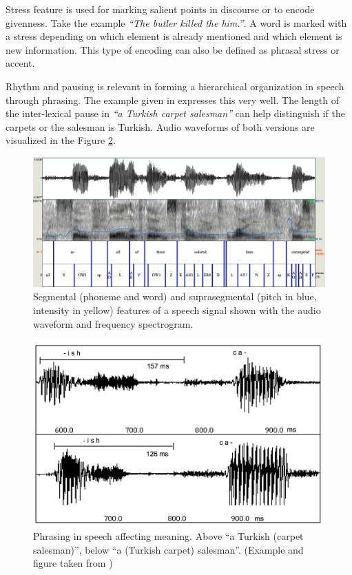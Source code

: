 Stress feature is used for marking salient points in discourse or to encode givenness. Take the example \textit{``The butler killed the him.''}. A word is marked with a stress depending on which element is already mentioned and which element is new information. This type of encoding can also be defined as phrasal stress or accent.

Rhythm and pausing is relevant in forming a hierarchical organization in speech through phrasing. The example given in \cite{zellner} expresses this very well. The length of the inter-lexical pause in \textit{``a Turkish carpet salesman''} can help distinguish if the carpets or the salesman is Turkish. Audio waveforms of both versions are visualized in the Figure \ref{sota:figure:carpet}.

\begin{figure}[t]
  \centering
  \includegraphics[width=\linewidth]{img/prosfeats_praat.png}
  \caption{Segmental (phoneme and word) and suprasegmental (pitch in blue, intensity in yellow) features of a speech signal shown with the audio waveform and frequency spectrogram. }
  \label{sota:figure:prosodicfeatures}
\end{figure}

\begin{figure}[t]
  \centering
  \includegraphics[width=0.8\linewidth]{img/carpet.png}
  \caption[Phrasing in speech affecting meaning.]{Phrasing in speech affecting meaning. Above ``a Turkish (carpet salesman)'', below ``a (Turkish carpet) salesman''. (Example and figure taken from \cite{zellner})}
  \label{sota:figure:carpet}
\end{figure}

